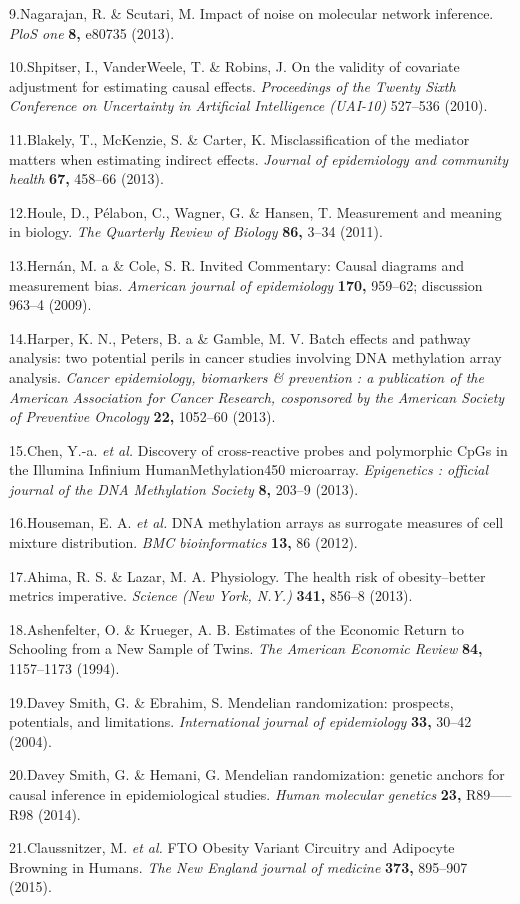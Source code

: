 \documentclass[]{article}
\begin{document}
9.Nagarajan, R. \& Scutari, M. Impact of noise on molecular network
inference. \emph{PloS one} \textbf{8,} e80735 (2013).

10.Shpitser, I., VanderWeele, T. \& Robins, J. On the validity of
covariate adjustment for estimating causal effects. \emph{Proceedings of
the Twenty Sixth Conference on Uncertainty in Artificial Intelligence
(UAI-10)} 527--536 (2010).

11.Blakely, T., McKenzie, S. \& Carter, K. Misclassification of the
mediator matters when estimating indirect effects. \emph{Journal of
epidemiology and community health} \textbf{67,} 458--66 (2013).

12.Houle, D., P{é}labon, C., Wagner, G. \& Hansen, T. Measurement and
meaning in biology. \emph{The Quarterly Review of Biology} \textbf{86,}
3--34 (2011).

13.Hern{á}n, M. a \& Cole, S. R. Invited Commentary: Causal diagrams and
measurement bias. \emph{American journal of epidemiology} \textbf{170,}
959--62; discussion 963--4 (2009).

14.Harper, K. N., Peters, B. a \& Gamble, M. V. Batch effects and
pathway analysis: two potential perils in cancer studies involving DNA
methylation array analysis. \emph{Cancer epidemiology, biomarkers \&
prevention : a publication of the American Association for Cancer
Research, cosponsored by the American Society of Preventive Oncology}
\textbf{22,} 1052--60 (2013).

15.Chen, Y.-a. \emph{et al.} Discovery of cross-reactive probes and
polymorphic CpGs in the Illumina Infinium HumanMethylation450
microarray. \emph{Epigenetics : official journal of the DNA Methylation
Society} \textbf{8,} 203--9 (2013).

16.Houseman, E. A. \emph{et al.} DNA methylation arrays as surrogate
measures of cell mixture distribution. \emph{BMC bioinformatics}
\textbf{13,} 86 (2012).

17.Ahima, R. S. \& Lazar, M. A. Physiology. The health risk of
obesity--better metrics imperative. \emph{Science (New York, N.Y.)}
\textbf{341,} 856--8 (2013).

18.Ashenfelter, O. \& Krueger, A. B. Estimates of the Economic Return to
Schooling from a New Sample of Twins. \emph{The American Economic
Review} \textbf{84,} 1157--1173 (1994).

19.{Davey Smith}, G. \& Ebrahim, S. Mendelian randomization: prospects,
potentials, and limitations. \emph{International journal of
epidemiology} \textbf{33,} 30--42 (2004).

20.{Davey Smith}, G. \& Hemani, G. Mendelian randomization: genetic
anchors for causal inference in epidemiological studies. \emph{Human
molecular genetics} \textbf{23,} R89-----R98 (2014).

21.Claussnitzer, M. \emph{et al.} FTO Obesity Variant Circuitry and
Adipocyte Browning in Humans. \emph{The New England journal of medicine}
\textbf{373,} 895--907 (2015).
\end{document}
